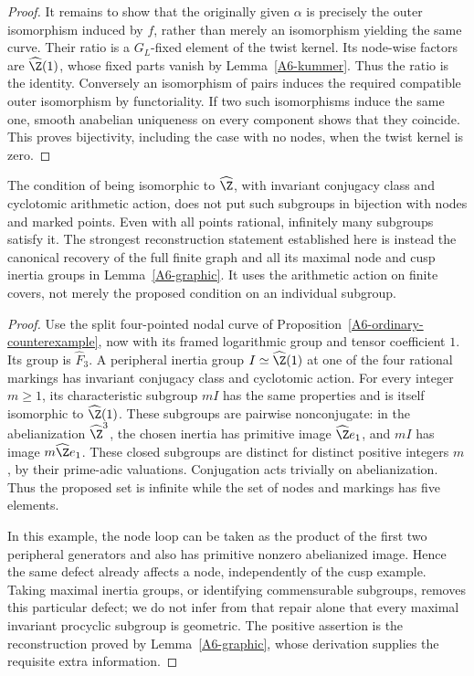 \begin{proof}
It remains to show that the originally given $\alpha$ is precisely the outer isomorphism induced by $f$, rather than merely an isomorphism yielding the same curve. Their ratio is a $G_L$-fixed element of the twist kernel. Its node-wise factors are $\widehat{\Z}(1)$, whose fixed parts vanish by Lemma~\ref{A6-kummer}. Thus the ratio is the identity. Conversely an isomorphism of pairs induces the required compatible outer isomorphism by functoriality. If two such isomorphisms induce the same one, smooth anabelian uniqueness on every component shows that they coincide. This proves bijectivity, including the case with no nodes, when the twist kernel is zero.
\end{proof}

\begin{proposition}\label{A6-procyclic}
The condition of being isomorphic to $\widehat{\Z}$, with invariant conjugacy class and cyclotomic arithmetic action, does not put such subgroups in bijection with nodes and marked points. Even with all points rational, infinitely many subgroups satisfy it. The strongest reconstruction statement established here is instead the canonical recovery of the full finite graph and all its maximal node and cusp inertia groups in Lemma~\ref{A6-graphic}. It uses the arithmetic action on finite covers, not merely the proposed condition on an individual subgroup.
\end{proposition}
\begin{proof}
Use the split four-pointed nodal curve of Proposition~\ref{A6-ordinary-counterexample}, now with its framed logarithmic group and tensor coefficient $1$. Its group is $\widehat{F}_3$. A peripheral inertia group $I\simeq\widehat{\Z}(1)$ at one of the four rational markings has invariant conjugacy class and cyclotomic action. For every integer $m\ge1$, its characteristic subgroup $mI$ has the same properties and is itself isomorphic to $\widehat{\Z}(1)$. These subgroups are pairwise nonconjugate: in the abelianization $\widehat{\Z}^3$, the chosen inertia has primitive image $\widehat{\Z} e_1$, and $mI$ has image $m\widehat{\Z} e_1$. These closed subgroups are distinct for distinct positive integers $m$, by their prime-adic valuations. Conjugation acts trivially on abelianization. Thus the proposed set is infinite while the set of nodes and markings has five elements.

In this example, the node loop can be taken as the product of the first two peripheral generators and also has primitive nonzero abelianized image. Hence the same defect already affects a node, independently of the cusp example. Taking maximal inertia groups, or identifying commensurable subgroups, removes this particular defect; we do not infer from that repair alone that every maximal invariant procyclic subgroup is geometric. The positive assertion is the reconstruction proved by Lemma~\ref{A6-graphic}, whose derivation supplies the requisite extra information.
\end{proof}

